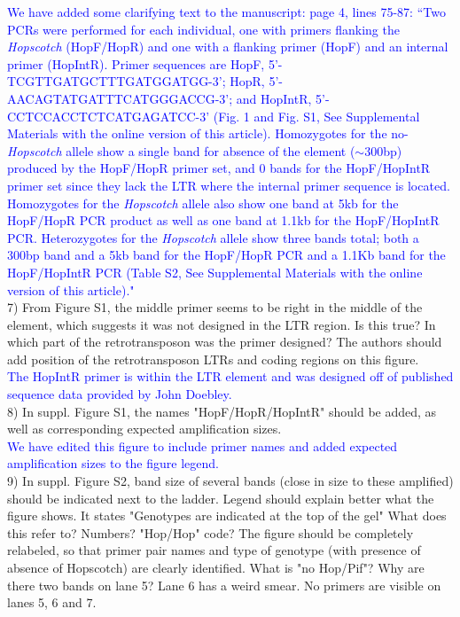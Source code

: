 \documentclass[11pt]{article}
\newcommand{\res}[1]{\noindent \textcolor{blue}{{#1}} \\}
\begin{document}
\res{We have added some clarifying text to the manuscript: page 4, lines 75-87: ``Two PCRs were performed for each individual, one with primers flanking the \emph{Hopscotch} (HopF/HopR) and one with a flanking primer (HopF) and an internal primer (HopIntR). Primer sequences are HopF, {\small 5'-TCGTTGATGCTTTGATGGATGG-3'}; 
HopR, {\small 5'-AACAGTATGATTTCATGGGACCG-3'}; and HopIntR, {\small  5'-CCTCCACCTCTCATGAGATCC-3'} (Fig. 1 and Fig. S1, See Supplemental Materials with the online version of this article). Homozygotes for the no-\emph{Hopscotch} allele show a single band for absence of the element ($\sim$300bp) produced by the HopF/HopR primer set, and 0 bands for the HopF/HopIntR primer set since they lack the LTR where the internal primer sequence is located. Homozygotes for the \emph{Hopscotch} allele also show one band at 5kb for the HopF/HopR PCR product as well as one band at 1.1kb for the HopF/HopIntR PCR. Heterozygotes for the \emph{Hopscotch} allele show three bands total; both a 300bp band and a 5kb band for the HopF/HopR PCR and a 1.1Kb band for the HopF/HopIntR PCR (Table S2, See Supplemental Materials with the online version of this article)."}





7) From Figure S1, the middle primer seems to be right in the middle of the element, which suggests it was not designed in the LTR region. Is this true? In which part of the retrotransposon was the primer designed? The authors should add position of the retrotransposon LTRs and coding regions on this figure. \\

\res{The HopIntR primer is within the LTR element and was designed off of published sequence data provided by John Doebley.}

8) In suppl. Figure S1, the names "HopF/HopR/HopIntR" should be added, as well as corresponding expected amplification sizes.\\

\res{We have edited this figure to include primer names and added expected amplification sizes to the figure legend.}

9) In suppl. Figure S2, band size of several bands (close in size to these amplified) should be indicated next to the ladder. Legend should explain better what the figure shows. It states "Genotypes are indicated at the top of the gel" What does this refer to? Numbers? "Hop/Hop" code? The figure should be completely relabeled, so that primer pair names and type of genotype (with presence of absence of Hopscotch) are clearly identified. What is "no Hop/Pif"? Why are there two bands on lane 5? Lane 6 has a weird smear. No primers are visible on lanes 5, 6 and 7.\\
\end{document}
